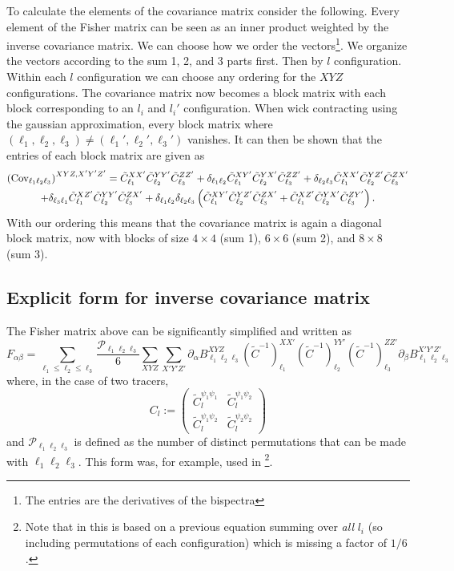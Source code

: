 \documentclass[11pt]{article} %
\DeclareRobustCommand{\Cov}{\ifmmode\text{Cov}\else d\fi}
\newcommand{\br}[1]{\ensuremath{\left( #1 \right)}}
\begin{document}
To calculate the elements of the covariance matrix consider the following. Every element of the Fisher matrix can be seen as an inner product weighted by the inverse covariance matrix. We can choose how we order the vectors\footnote{The entries are the derivatives of the bispectra}. We organize the vectors according to the sum 1, 2, and 3 parts first. Then by $l$ configuration. Within each $l$ configuration we can choose any ordering for the $XYZ$ configurations. The covariance matrix now becomes a block matrix with each block corresponding to an $l_i$ and $l_i'$ configuration. When wick contracting using the gaussian approximation, every block matrix where $(\ell_1,\ell_2,\ell_3)\neq (\ell_1',\ell_2',\ell_3')$ vanishes. It can then be shown that the entries of each block matrix are given as
\begin{gather*}
    \br{\Cov_{\ell_1\ell_2\ell_3}}^{XYZ,X'Y'Z'} = \tilde C^{XX'}_{\ell_1}\tilde C^{YY'}_{\ell_2}\tilde C^{ZZ'}_{\ell_3} + \delta_{\ell_1\ell_2}\tilde C^{XY'}_{\ell_1}\tilde C^{YX'}_{\ell_2}\tilde C^{ZZ'}_{\ell_3} +\delta_{\ell_2\ell_3}\tilde C^{XX'}_{\ell_1}\tilde C^{YZ'}_{\ell_2}\tilde C^{ZX'}_{\ell_3} \\ + \delta_{\ell_3\ell_1}\tilde C^{XZ'}_{\ell_1}\tilde C^{YY'}_{\ell_2}\tilde C^{ZX'}_{\ell_3} +\delta_{\ell_1\ell_2}\delta_{\ell_2\ell_3}\br{\tilde C^{XY'}_{\ell_1}\tilde C^{YZ'}_{\ell_2}\tilde C^{ZX'}_{\ell_3} +\tilde C^{XZ'}_{\ell_1}\tilde C^{YX'}_{\ell_2}\tilde C^{ZY'}_{\ell_3}}.
\end{gather*}
With our ordering this means that the covariance matrix is again a diagonal block matrix, now with blocks of size $4 \times 4$ (sum 1), $6 \times 6$ (sum 2), and $8 \times 8$ (sum 3).

\subsection{Explicit form for inverse covariance matrix}
The Fisher matrix above can be significantly simplified and written as
\begin{equation*}
F_{\alpha\beta} = \sum_{\ell_1 \leq \ell_2 \leq \ell_3} \frac{\mathcal P _{\ell_1\ell_2\ell_3}}{6}
\sum_{XYZ}\sum_{X'Y'Z'} 
\partial_\alpha B^{X Y Z}_{\ell_1 \ell_2 \ell_3} 
(\tilde C^{-1})^{X X'}_{\ell_1}
(\tilde C^{-1})^{Y Y'}_{\ell_2}
(\tilde C^{-1})^{Z Z'}_{\ell_3}
\partial_\beta B^{X' Y' Z'}_{\ell_1 \ell_2 \ell_3}
\end{equation*}
where, in the case of two tracers, 
\begin{equation*}
    C_{l} := \begin{pmatrix}
        \tilde C^{\psi_1\psi_1}_l & \tilde C^{\psi_1\psi_2}_l \\
        \tilde C^{\psi_1\psi_2}_l & \tilde C^{\psi_2\psi_2}_l
    \end{pmatrix}
\end{equation*}
and $\mathcal P_{\ell_1\ell_2\ell_3}$ is defined as the number of distinct permutations that can be made with $\ell_1\ell_2\ell_3$. This form was, for example, used in \cite{Kalaja_2021}\footnote{Note that in \cite{Kalaja_2021} this is based on a previous equation summing over \textit{all} $l_i$ (so including permutations of each configuration) which is missing a factor of $1/6$.}.
\end{document}
